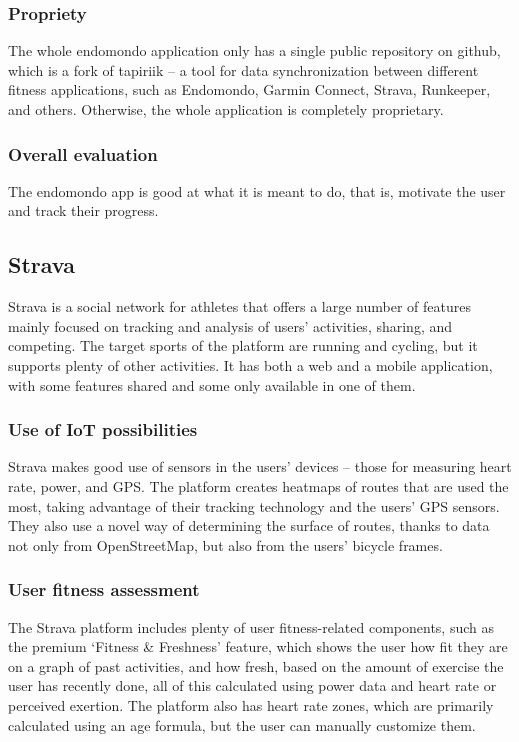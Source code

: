 \subsubsection*{Propriety}
The whole endomondo application only has a single public repository on github, which is a fork of tapiriik -- a tool for data synchronization between different fitness applications, such as Endomondo, Garmin Connect, Strava, Runkeeper, and others.\cite{endomondo-tapiriik}
Otherwise, the whole application is completely proprietary.
\subsubsection*{Overall evaluation}
The endomondo app is good at what it is meant to do, that is, motivate the user and track their progress.
\subsection{Strava}
Strava is a social network for athletes that offers a large number of features mainly focused on tracking and analysis of users' activities, sharing, and competing. \cite{strava}
The target sports of the platform are running and cycling, but it supports plenty of other activities.
It has both a web and a mobile application, with some features shared and some only available in one of them.
\subsubsection*{Use of IoT possibilities}
Strava makes good use of sensors in the users' devices -- those for measuring heart rate, power, and GPS.
The platform creates heatmaps of routes that are used the most, taking advantage of their tracking technology and the users' GPS sensors.
They also use a novel way of determining the surface of routes, thanks to data not only from OpenStreetMap, but also from the users' bicycle frames.

\subsubsection*{User fitness assessment}
The Strava platform includes plenty of user fitness-related components, such as the premium `Fitness \& Freshness' feature,
which shows the user how fit they are on a graph of past activities, and how fresh, based on the amount of exercise the user has recently done,
all of this calculated using power data and heart rate or perceived exertion. \cite{strava-fitness-freshness}
The platform also has heart rate zones, which are primarily calculated using an age formula, but the user can manually customize them.
